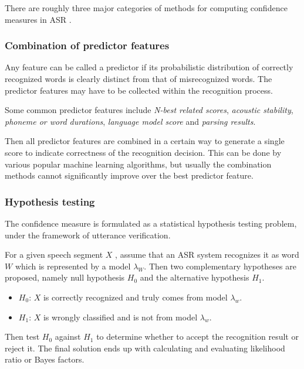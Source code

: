 \documentclass[11pt,a4paper]{report}
\begin{document}
There are roughly three major categories of methods for computing confidence measures in ASR \parencite{jiang2005confidence}.

\subsubsection{Combination of predictor features}

Any feature can be called a predictor if its probabilistic distribution of correctly recognized words is clearly distinct from that of misrecognized words.
The predictor features may have to be collected within the recognition process.

Some common predictor features include \textit{N-best related scores}, \textit{acoustic stability}, \textit{phoneme or word durations}, \textit{language model score} and \textit{parsing results}.

Then all predictor features are combined in a certain way to generate a single score to indicate correctness of the recognition decision.
This can be done by various popular machine learning algorithms, but usually the combination methods cannot significantly improve over the best predictor feature.

\subsubsection{Hypothesis testing}

The confidence measure is formulated as a statistical hypothesis testing problem, under the framework of utterance verification.

For a given speech segment \(X\) , assume that an ASR system recognizes it as word \(W\) which is represented by a model \(\lambda_W\).
Then two complementary hypotheses are proposed, namely null hypothesis \(H_0\) and the alternative hypothesis \(H_1\).

\begin{itemize}
  \item \(H_0\): \(X\) is correctly recognized and truly comes from model \(\lambda_w\).
  \item \(H_1\): \(X\) is wrongly classified and is not from model \(\lambda_w\).
\end{itemize}

Then test \(H_0\) against \(H_1\) to determine whether to accept the recognition result or reject it.
The final solution ends up with calculating and evaluating likelihood ratio or Bayes factors.
\end{document}
